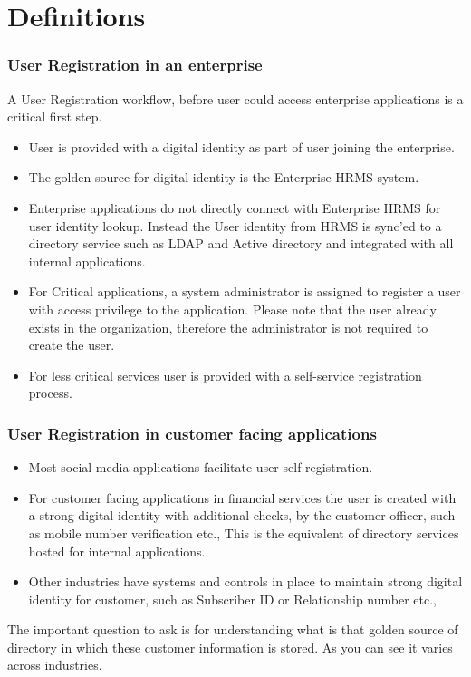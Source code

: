\documentclass[13pt, aspectratio=169]{beamer}
\begin{document}
\section{Definitions}

\begin{frame}
	\frametitle{User Registration in an enterprise}
A User Registration workflow, before user could access enterprise applications is a critical first step.
	\begin{itemize}
		\item User is provided with a digital identity as part of user joining the enterprise.
		\item The golden source for digital identity is the Enterprise HRMS system.
		\item Enterprise applications do not directly connect with Enterprise HRMS for user identity lookup. Instead the User identity from HRMS is sync'ed to a directory service such as LDAP and Active directory and integrated with all internal applications.
		\item For Critical applications, a system administrator is assigned to register a user with access privilege to the application. Please note that the user already exists in the organization, therefore the administrator is not required to create the user.
		\item For less critical services user is provided with a self-service registration process.
	\end{itemize}
\end{frame}

\begin{frame}
	\frametitle{User Registration in customer facing applications}

	\begin{itemize}
		\item Most social media applications facilitate user self-registration.
		\item For customer facing applications in financial services the user is created with a strong digital identity with additional checks, by the customer officer, such as mobile number verification etc., This is the equivalent of directory services hosted for internal applications.
		\item Other industries have systems and controls in place to maintain strong digital identity for customer, such as Subscriber ID or Relationship number etc.,
	\end{itemize}
The important question to ask is for understanding what is that golden source of directory in which these customer information is stored. As you can see it varies across industries.

\end{frame}
\end{document}
